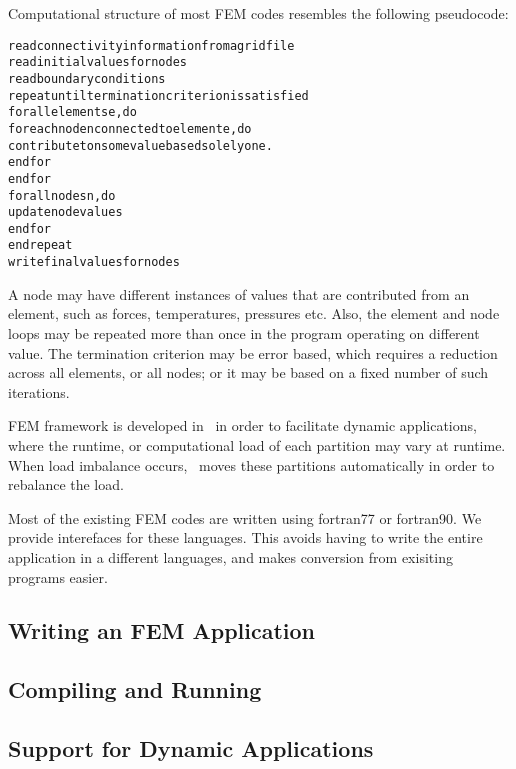 Computational structure of most FEM codes resembles the following pseudocode:

\begin{alltt}
  read connectivity information from a grid file
  read initial values for nodes
  read boundary conditions
  repeat until termination criterion is satisfied
    for all elements e, do
      for each node n connected to element e, do
        contribute to n some value based solely on e.
      end for
    end for
    for all nodes n, do
      update node values
    end for
  end repeat
  write final values for nodes
\end{alltt}

A node may have different instances of values that are contributed from an
element, such as forces, temperatures, pressures etc. Also, the element and
node loops may be repeated more than once in the program operating on different
value. The termination criterion may be error based, which requires a reduction
across all elements, or all nodes; or it may be based on a fixed number of such
iterations.

FEM framework is developed in \charmpp\ in order to facilitate dynamic
applications, where the runtime, or computational load of each partition may
vary at runtime. When load imbalance occurs, \charmpp\ moves these partitions
automatically in order to rebalance the load.

Most of the existing FEM codes are written using fortran77 or fortran90.  We
provide interefaces for these languages. This avoids having to write the entire
application in a different languages, and makes conversion from exisiting
programs easier.


\subsection{Writing an FEM Application}

\subsection{Compiling and Running}

\subsection{Support for Dynamic Applications}
